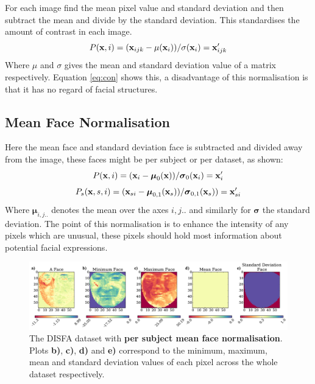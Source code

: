       For each image find the mean pixel value and standard deviation and then subtract the mean
      and divide by the standard deviation. This standardises the amount of contrast in each image.
      \begin{equation}
         P({\bf x},i)= ({\bf x}_{ijk} - \mu({\bf x}_{i}))/\sigma ({\bf x}_{i}) = {\bf x}_{ijk}'
         \label{eq:con}
      \end{equation}
      Where $\mu$ and $\sigma$ gives the mean and standard deviation value of a matrix respectively.
      Equation \ref{eq:con} shows this, a disadvantage of this normalisation is that it
      has no regard of facial structures.

    \subsection{Mean Face Normalisation} \label{sec:meanface}
      Here the mean face and standard deviation face is subtracted and divided away from the
      image, these faces might be per subject or per dataset, as shown:
      \begin{equation}
        P({\bf x},i) =  ({\bf x}_{i} - {\boldsymbol \mu}_0( {\bf x}))/{\boldsymbol \sigma}_0({\bf x}_{i})  = {\bf x}_{i}'
      \end{equation}
      \begin{equation}
        P_s({\bf x},s,i) = ({\bf x}_{si} - {\boldsymbol \mu}_{0,1}( {\bf x}_s))/{\boldsymbol \sigma}_{0,1}( {\bf x}_s))  = {\bf x}_{si}'
      \end{equation}
      Where ${\boldsymbol \mu}_{i,j..}$ denotes the mean over the axes $i,j..$ and
      similarly for ${\boldsymbol \sigma} $ the standard deviation.
      The point of this normalisation is to enhance the intensity of any pixels which
      are unusual, these pixels should hold most information about potential facial expressions.
      \begin{figure}[!h] \centering
      \includegraphics[width =\hsize]{figures/faces_per_subject_face.pdf}
      \caption{The DISFA dataset with {\bf per subject mean face normalisation}.
      Plots {\bf b)}, {\bf c)}, {\bf d)} and {\bf e)} correspond to the minimum,
      maximum, mean and standard deviation values of each pixel across the whole
      dataset respectively.}
      \label{fig:}
      \end{figure}

